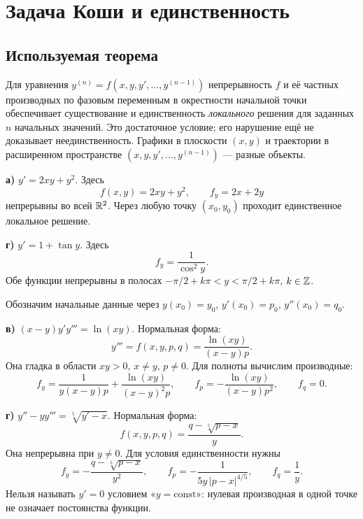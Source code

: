 \section{Задача Коши и единственность}

\subsection*{Используемая теорема}
Для уравнения $y^{(n)}=f(x,y,y',\ldots,y^{(n-1)})$ непрерывность $f$
и её частных производных по фазовым переменным в окрестности
начальной точки обеспечивает существование и единственность
\emph{локального} решения для заданных $n$ начальных значений.
Это достаточное условие; его нарушение ещё не доказывает неединственность.
Графики в плоскости $(x,y)$ и траектории в расширенном пространстве
$(x,y,y',\ldots,y^{(n-1)})$ --- разные объекты.

\textbf{а)} $y'=2xy+y^2$. Здесь
\[
 f(x,y)=2xy+y^2,\qquad f_y=2x+2y
\]
непрерывны во всей $\mathbb{R}^2$. Через любую точку $(x_0,y_0)$ проходит
единственное локальное решение.

\textbf{г)} $y'=1+\tan y$. Здесь
\[
 f_y=\frac1{\cos^2y}.
\]
Обе функции непрерывны в полосах
$-\pi/2+k\pi<y<\pi/2+k\pi$, $k\in\mathbb{Z}$.

Обозначим начальные данные через
$y(x_0)=y_0$, $y'(x_0)=p_0$, $y''(x_0)=q_0$.

\textbf{в)} $(x-y)y'y'''=\ln(xy)$. Нормальная форма:
\[
 y'''=f(x,y,p,q)=\frac{\ln(xy)}{(x-y)p}.
\]
Она гладка в области $xy>0$, $x\ne y$, $p\ne0$.
Для полноты вычислим производные:
\[
 f_y=\frac1{y(x-y)p}+\frac{\ln(xy)}{(x-y)^2p},\qquad
 f_p=-\frac{\ln(xy)}{(x-y)p^2},\qquad f_q=0.
\]

\textbf{г)} $y''-yy'''=\sqrt[5]{y'-x}$. Нормальная форма:
\[
 f(x,y,p,q)=\frac{q-\sqrt[5]{p-x}}y.
\]
Она непрерывна при $y\ne0$. Для условия единственности нужны
\[
 f_y=-\frac{q-\sqrt[5]{p-x}}{y^2},\qquad
 f_p=-\frac1{5y\,|p-x|^{4/5}},\qquad f_q=\frac1y.
\]
Нельзя называть $y'=0$ условием «$y=\mathrm{const}$»:
нулевая производная в одной точке не означает постоянства функции.

